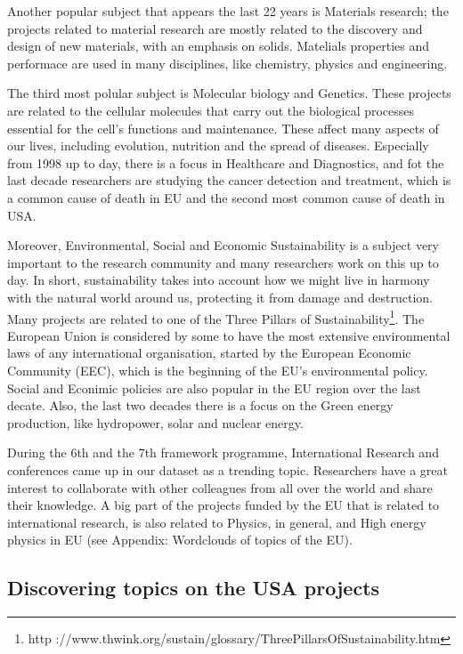 \documentclass[12pt]{report}
\begin{document}
Another popular subject that appears the last 22 years is Materials research;
the projects related to material research are mostly related to the discovery
and design of new materials, with an emphasis on solids. Matelials properties
and performace are used in many disciplines, like chemistry, physics and
engineering.

The third most polular subject is Molecular biology and Genetics. These projects
are related to the cellular molecules that carry out the biological processes
essential for the cell's functions and maintenance. These affect many aspects of
our lives, including evolution, nutrition and the spread of diseases. Especially
from 1998 up to day, there is a focus in Healthcare and Diagnostics, and fot the
last decade researchers are studying the cancer detection and treatment, which
is a common cause of death in EU and the second most common cause of death in
USA.

Moreover, Environmental, Social and Economic Sustainability is a subject very
important to the research community and many researchers work on this up to day.
In short, sustainability takes into account how we might live in harmony with
the natural world around us, protecting it from damage and destruction. Many
projects are related to one of the Three Pillars of Sustainability\footnote{http
://www.thwink.org/sustain/glossary/ThreePillarsOfSustainability.htm}. The
European Union is considered by some to have the most extensive environmental
laws of any international organisation, started by the  European Economic
Community (EEC), which is the beginning of the EU's environmental policy. Social
and Econimic policies are also popular in the EU region over the last decate.
Also, the last two decades there is a focus on the Green energy production, like
hydropower, solar and nuclear energy.

During the 6th and the 7th framework programme, International Research and
conferences came up in our dataset as a trending topic. Researchers have a great
interest to collaborate with other colleagues from all over the world and share
their knowledge. A big part of the projects funded by the EU that is related to
international research, is also related to Physics, in general, and High energy
physics in EU (see Appendix: Wordclouds of topics of the EU).

\subsection{Discovering topics on the USA projects}
\end{document}
